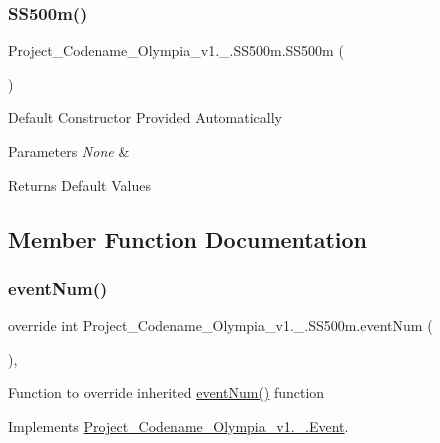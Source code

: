 \subsubsection{\texorpdfstring{S\+S500m()}{SS500m()}}
{\footnotesize\ttfamily Project\+\_\+\+Codename\+\_\+\+Olympia\+\_\+v1.\+\_.\+S\+S500m.\+S\+S500m (\begin{DoxyParamCaption}{ }\end{DoxyParamCaption})\hspace{0.3cm}{\ttfamily [inline]}}

Default Constructor Provided Automatically 
\begin{DoxyParams}{Parameters}
{\em None} & \\
\hline
\end{DoxyParams}
\begin{DoxyReturn}{Returns}
Default Values 
\end{DoxyReturn}


\subsection{Member Function Documentation}
\mbox{\label{classProject__Codename__Olympia__v1_1_1__0_1_1SS500m_a7b5584a50c59e67457f86ebd38b8e4a8}} 
\subsubsection{\texorpdfstring{event\+Num()}{eventNum()}}
{\footnotesize\ttfamily override int Project\+\_\+\+Codename\+\_\+\+Olympia\+\_\+v1.\+\_.\+S\+S500m.\+event\+Num (\begin{DoxyParamCaption}{ }\end{DoxyParamCaption})\hspace{0.3cm}{\ttfamily [inline]}, {\ttfamily [virtual]}}

Function to override inherited \hyperlink{classProject__Codename__Olympia__v1_1_1__0_1_1SS500m_a7b5584a50c59e67457f86ebd38b8e4a8}{event\+Num()} function 

Implements \hyperlink{classProject__Codename__Olympia__v1_1_1__0_1_1Event_ad1154ef4dd1dec29d8ebf5614d84b1f3}{Project\+\_\+\+Codename\+\_\+\+Olympia\+\_\+v1.\+\_.\+Event}.

